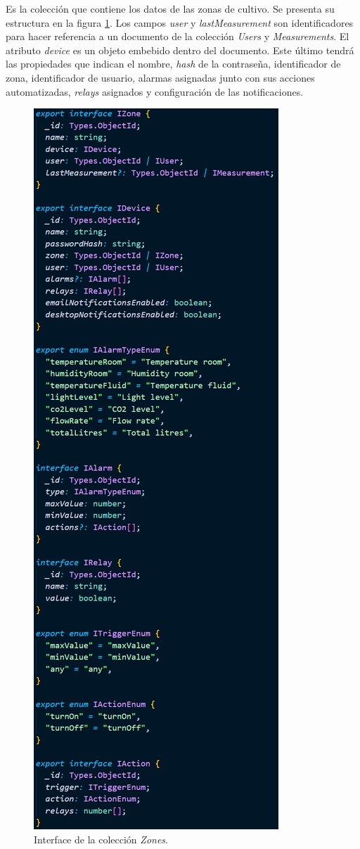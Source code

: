 Es la colección que contiene los datos de las zonas de cultivo. Se presenta su estructura en la figura \ref{fig:coleccionZones}. Los campos \textit{user} y \textit{lastMeasurement} son identificadores para hacer referencia a un documento de la colección \textit{Users} y \textit{Measurements}. El atributo \textit{device} es un objeto embebido dentro del documento. Este último tendrá las propiedades que indican el nombre, \emph{hash} de la contraseña, identificador de zona, identificador de usuario, alarmas asignadas junto con sus acciones automatizadas, \emph{relays} asignados y configuración de las notificaciones.

\begin{figure}[H]
	\centering
	\includegraphics[width=.6\textwidth]{./Figures/Coleccion Zones.png}
	\caption{Interface de la colección \textit{Zones}.}
	\label{fig:coleccionZones}
\end{figure}

